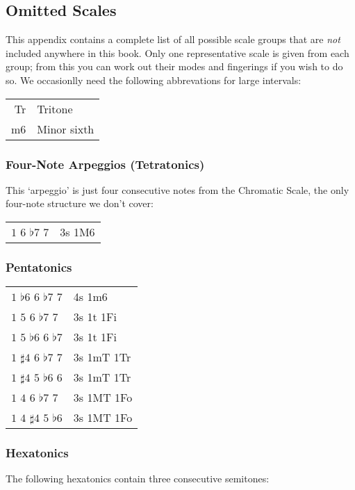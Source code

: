 \documentclass[english]{./gbook}
\begin{document}
\begin{large}
\appendix
\chapter{Omitted Scales}

This appendix contains a complete list of all possible scale groups that are \emph{not} included anywhere in this book. Only one representative scale is given from each group; from this you can work out their modes and fingerings if you wish to do so. We occasionlly need the following abbrevations for large intervals:
\begin{tabular}{rl}
	Tr & Tritone \\
	m6 & Minor sixth
\end{tabular}

\subsection*{Four-Note Arpeggios (Tetratonics)}

This `arpeggio' is just four consecutive notes from the Chromatic Scale, the only four-note structure we don't cover:

\begin{tabular}{ll}
    $1$ $6$ $\flat7$ $7$   &   3s 1M6   
\end{tabular}

\subsection*{Pentatonics}
\begin{tabular}{ll}
    $1$ $\flat6$ $6$ $\flat7$ $7$   &   4s 1m6      \\
    $1$ $5$ $6$ $\flat7$ $7$   &   3s 1t 1Fi      \\
    $1$ $5$ $\flat6$ $6$ $\flat7$   &   3s 1t 1Fi      \\
    $1$ $\sharp4$ $6$ $\flat7$ $7$   &   3s 1mT 1Tr      \\
    $1$ $\sharp4$ $5$ $\flat6$ $6$   &   3s 1mT 1Tr      \\
    $1$ $4$ $6$ $\flat7$ $7$   &   3s 1MT 1Fo      \\
    $1$ $4$ $\sharp4$ $5$ $\flat6$   &   3s 1MT 1Fo      
\end{tabular}

\subsection*{Hexatonics}
The following hexatonics contain three consecutive semitones:


\end{large}
\end{document}
